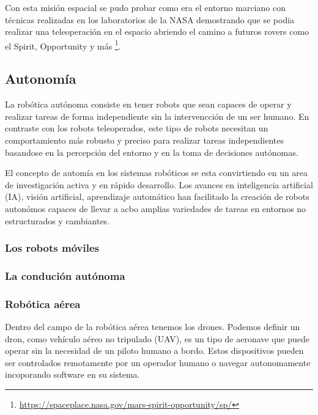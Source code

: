 \newpage
Con esta misión espacial se pudo probar como era el entorno marciano con técnicas realizadas en los laboratorios de la NASA demostrando que se podia realizar una teleoperación en 
el espacio abriendo el camino a futuros rovers como el Spirit, Opportunity y más \footnote{\url{https://spaceplace.nasa.gov/mars-spirit-opportunity/sp/}}. 

\subsection{Autonomía}
\label{sec:subseccion}

La robótica autónoma consiste en tener robots que sean capaces de operar y realizar tareas de forma independiente sin la intervencción de un ser humano. En contraste con los 
robots teleoperados, este tipo de robots necesitan un comportamiento más robusto y preciso para realizar tareas independientes basandose en la percepción del entorno 
y en la toma de decisiones autónomas. \newline

El concepto de automía en los sistemas robóticos se esta convirtiendo en un area de investigación activa y en rápido desarrollo. Los avances en inteligencia artificial (IA), visión 
artificial, aprendizaje automático han facilitado la creación de robots autonómos capaces de llevar a acbo amplias variedades de tareas en entornos no estructurados y cambiantes. 

\subsubsection{Los robots móviles}
\label{sec:subseccion}


\subsubsection{La condución autónoma}
\label{sec:subseccion}

\subsubsection{Robótica aérea}
\label{sec:subseccion}

Dentro del campo de la robótica aérea tenemos los drones. Podemos definir un dron, como vehículo aéreo no tripulado (UAV), es un tipo de aeronave que puede operar sin la 
necesidad de un piloto humano a bordo. Estos dispositivos pueden ser controlados remotamente por un operador humano o navegar autonomamente incoporando software 
en su sistema. \newline

